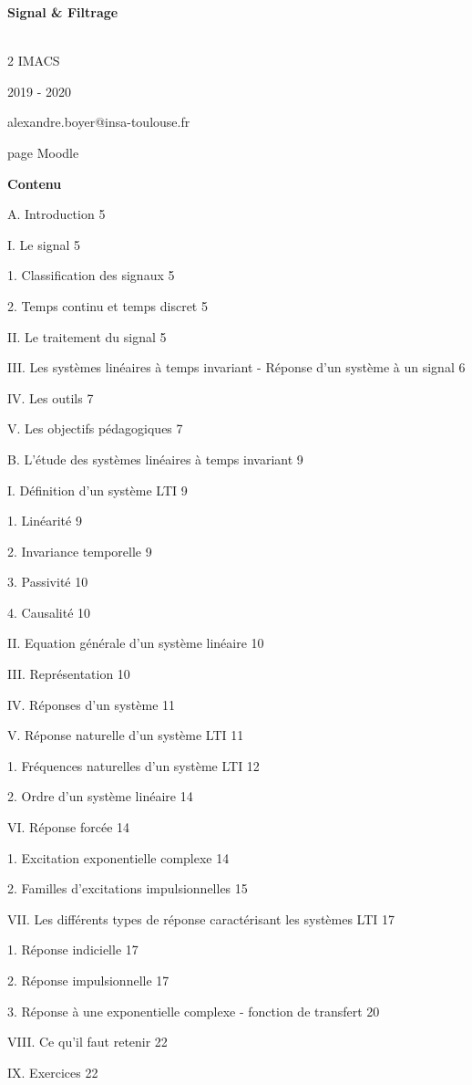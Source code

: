 \documentclass[]{article}
\begin{document}
\textbf{Signal \& Filtrage}

\textbf{}\\

2 IMACS

2019 - 2020

alexandre.boyer@insa-toulouse.fr

page Moodle

\textbf{Contenu}

A. Introduction 5

I. Le signal 5

1. Classification des signaux 5

2. Temps continu et temps discret 5

II. Le traitement du signal 5

III. Les systèmes linéaires à temps invariant - Réponse d'un système à
un signal 6

IV. Les outils 7

V. Les objectifs pédagogiques 7

B. L'étude des systèmes linéaires à temps invariant 9

I. Définition d'un système LTI 9

1. Linéarité 9

2. Invariance temporelle 9

3. Passivité 10

4. Causalité 10

II. Equation générale d'un système linéaire 10

III. Représentation 10

IV. Réponses d'un système 11

V. Réponse naturelle d'un système LTI 11

1. Fréquences naturelles d'un système LTI 12

2. Ordre d'un système linéaire 14

VI. Réponse forcée 14

1. Excitation exponentielle complexe 14

2. Familles d'excitations impulsionnelles 15

VII. Les différents types de réponse caractérisant les systèmes LTI 17

1. Réponse indicielle 17

2. Réponse impulsionnelle 17

3. Réponse à une exponentielle complexe - fonction de transfert 20

VIII. Ce qu'il faut retenir 22

IX. Exercices 22
\end{document}
